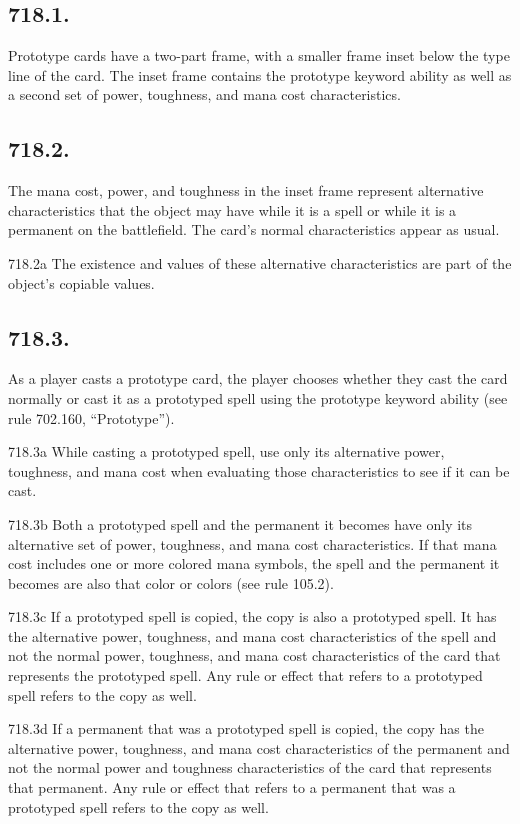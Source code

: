 \subsection*{718.1.}
Prototype cards have a two-part frame, with a smaller frame inset below the type line of the card. The inset frame contains the prototype keyword ability as well as a second set of power, toughness, and mana cost characteristics.

\subsection*{718.2.}
The mana cost, power, and toughness in the inset frame represent alternative characteristics that the object may have while it is a spell or while it is a permanent on the battlefield. The card’s normal characteristics appear as usual.

718.2a The existence and values of these alternative characteristics are part of the object’s copiable values.

\subsection*{718.3.}
As a player casts a prototype card, the player chooses whether they cast the card normally or cast it as a prototyped spell using the prototype keyword ability (see rule 702.160, “Prototype”).

718.3a While casting a prototyped spell, use only its alternative power, toughness, and mana cost when evaluating those characteristics to see if it can be cast.

718.3b Both a prototyped spell and the permanent it becomes have only its alternative set of power, toughness, and mana cost characteristics. If that mana cost includes one or more colored mana symbols, the spell and the permanent it becomes are also that color or colors (see rule 105.2).

718.3c If a prototyped spell is copied, the copy is also a prototyped spell. It has the alternative power, toughness, and mana cost characteristics of the spell and not the normal power, toughness, and mana cost characteristics of the card that represents the prototyped spell. Any rule or effect that refers to a prototyped spell refers to the copy as well.

718.3d If a permanent that was a prototyped spell is copied, the copy has the alternative power, toughness, and mana cost characteristics of the permanent and not the normal power and toughness characteristics of the card that represents that permanent. Any rule or effect that refers to a permanent that was a prototyped spell refers to the copy as well.

